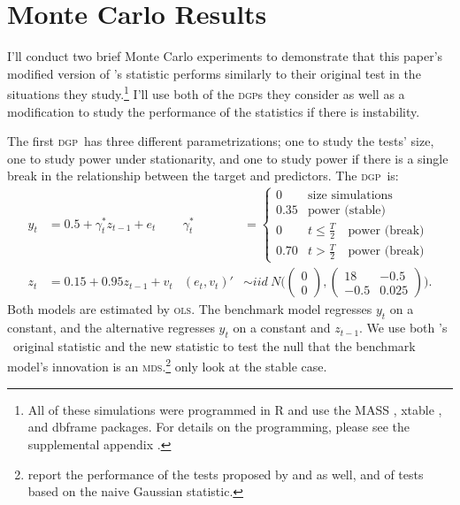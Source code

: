 \documentclass[11pt,fleqn]{article}
\newcommand\citepos[2][]{\citeauthor{#2}'s \citeyearpar[#1]{#2}}
\newcommand\poscw{\citeauthor{ClW:06}'s \citeyearpar{ClW:06,ClW:07}}
\theoremstyle{definition}
\newcommand{\dgp}{\textsc{dgp}}
\newcommand{\mds}{\textsc{mds}}
\newcommand{\ols}{\textsc{ols}}
\begin{document}
\section{Monte Carlo Results}\label{sec:2}
I'll conduct two brief Monte Carlo experiments to demonstrate that
this paper's modified version of \citepos{ClW:07} statistic performs
similarly to their original test in the situations they
study.\footnote{All of these simulations were programmed in R
  \citep[version 2.14.0]{R} and use the \textsc{MASS} \citep[version
  info]{VeR:02}, xtable \citep[1.6-0]{Dah:09}, and dbframe
  \citep[version 0.2.1]{Cal:10b} packages.  For details on the
  programming, please see the supplemental appendix \citep{Cal:11f}.}
I'll use both of the \dgp s they consider as well as a modification to
study the performance of the statistics if there is instability.

The first \dgp\ has three different parametrizations; one to study the
tests' size, one to study power under stationarity, and one to study
power if there is a single break in the relationship between the
target and predictors.  The \dgp\ is:
\begin{align*}
  y_t &= 0.5 + \gamma^{*}_t z_{t-1} + e_t &
  \gamma^{*}_t &=
  \begin{cases}
    0    & \text{size simulations} \\
    0.35 & \text{power (stable)} \\
    0    & t \leq \tfrac{T}{2} \quad \text{power (break)} \\
    0.70 & t > \tfrac{T}{2} \quad \text{power (break)}
  \end{cases}\\\nonumber
  z_t &= 0.15 + 0.95 z_{t-1} + v_t &
  (e_t, v_t)' &\sim iid\ N\Bigg(\begin{pmatrix} 0 \\ 0
  \end{pmatrix}
   , \begin{pmatrix} 18 & -
    0.5 \\ -0.5 & 0.025 \end{pmatrix}\Bigg).
\end{align*}
Both models are estimated by \ols. The benchmark model regresses $y_t$
on a constant, and the alternative regresses $y_t$ on a constant and
$z_{t-1}$.  We use both \poscw\ original statistic and the new
statistic to test the null that the benchmark model's innovation is an
\mds.\footnote{\citet{ClW:07} report the performance of the tests
  proposed by \citet{CCS:01} and \citet{ClM:05} as well, and of tests
  based on the naive Gaussian statistic.}  \citet{ClW:06,ClW:07} only
look at the stable case.
\end{document}
